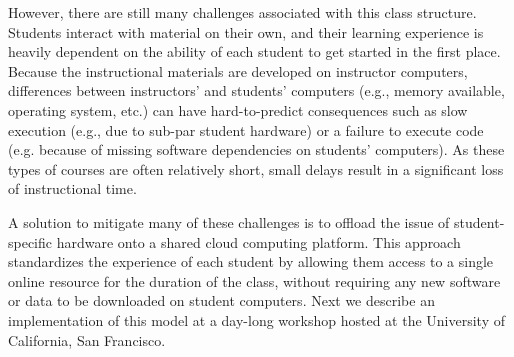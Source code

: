 However, there are still many challenges associated with this class structure.
Students interact with material on their own, and their learning experience is
heavily dependent on the ability of each student to get started in the first
place. Because the instructional materials are developed on instructor
computers, differences between instructors' and students' computers (e.g., memory
available, operating system, etc.) can have hard-to-predict consequences such
as slow execution (e.g., due to sub-par student hardware) or a failure to
execute code (e.g. because of missing software dependencies on
students' computers). As these types of courses are often relatively short,
small delays result in a significant loss of instructional time.

A solution to mitigate many of these challenges is to offload the issue of
student-specific hardware onto a shared cloud computing platform. This approach
standardizes the experience of each student by allowing them access to a single
online resource for the duration of the class, without requiring any new
software or data to be downloaded on student computers. Next we describe
an implementation of this model at a day-long workshop hosted at the
University of California, San Francisco.
